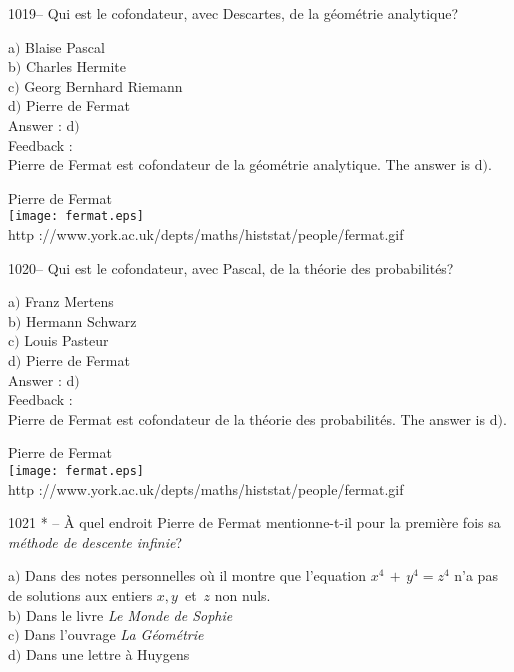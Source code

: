 \documentclass[letterpaper, 12pt]{article}
\begin{document}
1019-- Qui est le cofondateur, avec Descartes, de la g\'eom\'etrie
analytique?

a$)$ Blaise Pascal \\
b$)$ Charles Hermite \\
c$)$ Georg Bernhard Riemann \\
d$)$ Pierre de Fermat\\

Answer : d$)$\\

Feedback : \\
Pierre de Fermat est cofondateur de la g\'eom\'etrie analytique.
The answer is d$)$.\\

        \begin{center}
        Pierre de Fermat\\
    \texttt{[image: fermat.eps]}\\
        {\footnotesize http
://www.york.ac.uk/depts/maths/histstat/people/fermat.gif}
    \end{center}

1020-- Qui est le cofondateur, avec Pascal, de la th\'eorie des
probabilit\'es?

a$)$ Franz Mertens \\
b$)$ Hermann Schwarz \\
c$)$ Louis Pasteur \\
d$)$ Pierre de Fermat\\

Answer : d$)$\\

Feedback : \\
Pierre de Fermat est cofondateur de la th\'eorie des probabilit\'es.
The answer is d$)$.\\

        \begin{center}
        Pierre de Fermat\\
    \texttt{[image: fermat.eps]}\\
        {\footnotesize http
://www.york.ac.uk/depts/maths/histstat/people/fermat.gif}
    \end{center}

1021 * -- \`A quel endroit Pierre de Fermat mentionne-t-il pour la
premi\`ere fois sa {\sl m\'ethode de descente infinie}?

a$)$ Dans des notes personnelles o\`u il montre que l'equation
$x^4\,+\,y^4=z^4$ n'a pas de solutions
aux entiers $x,y\,$ et $\,z$ non nuls. \\
b$)$ Dans le livre {\sl Le Monde de Sophie} \\
c$)$ Dans l'ouvrage {\sl La G\'eom\'etrie} \\
d$)$ Dans une lettre \`a Huygens\\
\end{document}
